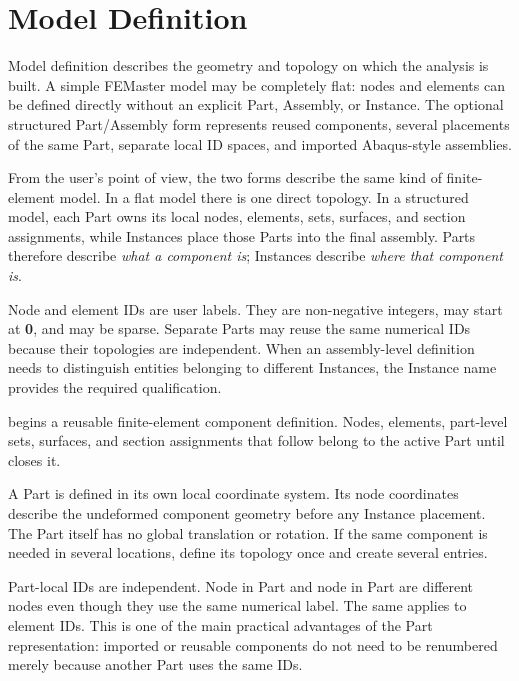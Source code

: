 \chapter{Model Definition}
\label{chap:model-definition}

Model definition describes the geometry and topology on which the analysis is built. A simple FEMaster model may be completely flat: nodes and elements can be defined directly without an explicit Part, Assembly, or Instance. The optional structured Part/Assembly form represents reused components, several placements of the same Part, separate local ID spaces, and imported Abaqus-style assemblies.

From the user's point of view, the two forms describe the same kind of finite-element model. In a flat model there is one direct topology. In a structured model, each Part owns its local nodes, elements, sets, surfaces, and section assignments, while Instances place those Parts into the final assembly. Parts therefore describe \emph{what a component is}; Instances describe \emph{where that component is}.

Node and element IDs are user labels. They are non-negative integers, may start at \textbf{0}, and may be sparse. Separate Parts may reuse the same numerical IDs because their topologies are independent. When an assembly-level definition needs to distinguish entities belonging to different Instances, the Instance name provides the required qualification.


 begins a reusable finite-element component definition. Nodes, elements, part-level sets, surfaces, and section assignments that follow belong to the active Part until  closes it.

A Part is defined in its own local coordinate system. Its node coordinates describe the undeformed component geometry before any Instance placement. The Part itself has no global translation or rotation. If the same component is needed in several locations, define its topology once and create several  entries.

Part-local IDs are independent. Node  in Part  and node  in Part  are different nodes even though they use the same numerical label. The same applies to element IDs. This is one of the main practical advantages of the Part representation: imported or reusable components do not need to be renumbered merely because another Part uses the same IDs.

